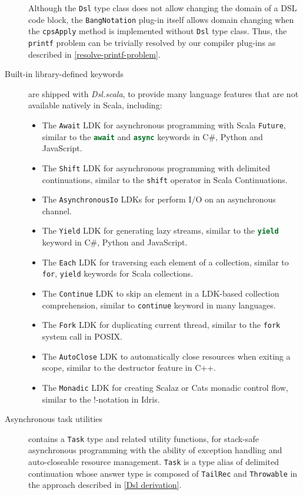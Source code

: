 \begin{description}
  Although the \lstinline{Dsl} type class does not allow changing the domain of a DSL code block, the \lstinline{BangNotation} plug-in itself allows domain changing when the \lstinline{cpsApply} method is implemented without \lstinline{Dsl} type class. Thus, the \lstinline{printf} problem can be trivially resolved by our compiler plug-ins as described in \cref{resolve-printf-problem}.
  \item[Built-in library-defined keywords] are shipped with \textit{Dsl.scala}, to provide many language features that are not available natively in Scala, including:
  \begin{itemize}
    \item The \lstinline{Await} LDK for asynchronous programming with Scala \lstinline{Future}, similar to the \lstinline[language=Python,style=Python3]{await} and \lstinline[language=Python,style=Python3]{async} keywords in C\#, Python and JavaScript.
    \item The \lstinline{Shift} LDK for asynchronous programming with delimited continuations, similar to the \lstinline{shift} operator in Scala Continuations.
    \item The \lstinline{AsynchronousIo} LDKs for perform I/O on an asynchronous channel.
    \item The \lstinline{Yield} LDK for generating lazy streams, similar to the \lstinline[language=Python,style=Python3]{yield} keyword in C\#, Python and JavaScript.
    \item The \lstinline{Each} LDK for traversing each element of a collection, similar to \lstinline{for}, \lstinline{yield} keywords for Scala collections.
    \item The \lstinline{Continue} LDK to skip an element in a LDK-based collection comprehension, similar to \lstinline{continue} keyword in many languages.
    \item The \lstinline{Fork} LDK for duplicating current thread, similar to the \lstinline{fork} system call in POSIX.
    \item The \lstinline{AutoClose} LDK to automatically close resources when exiting a scope, similar to the destructor feature in C++.
    \item The \lstinline{Monadic} LDK for creating Scalaz \cite{kenji2017scalaz} or Cats \cite{typelevel2017cats} monadic control flow, similar to the !-notation in Idris\cite{brady2013idris}.
  \end{itemize}
  \item[Asynchronous task utilities] contains a \lstinline{Task} type and related utility functions, for stack-safe asynchronous programming with the ability of exception handling and auto-closeable resource management. \lstinline{Task} is a type alias of delimited continuation whose answer type is composed of \lstinline{TailRec} and \lstinline{Throwable} in the approach described in \cref{Dsl derivation}.


\end{description}
